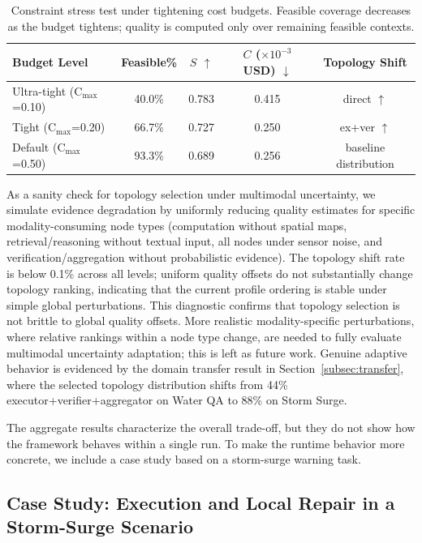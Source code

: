 \documentclass[manuscript,review,anonymous]{acmart}
\begin{document}
\begin{table}[t]
\centering
\caption{Constraint stress test under tightening cost budgets. Feasible coverage decreases as the budget tightens; quality is computed only over remaining feasible contexts.}
\label{tab:constraint_stress}
\small
\begin{tabular}{lcccc}
\toprule
\textbf{Budget Level} & \textbf{Feasible\%} & \textbf{$S$ $\uparrow$} & \textbf{$C$ ($\times 10^{-3}$ USD) $\downarrow$} & \textbf{Topology Shift} \\
\midrule
Ultra-tight (C$_{\max}$=0.10) & 40.0\% & 0.783 & 0.415 & direct $\uparrow$ \\
Tight (C$_{\max}$=0.20) & 66.7\% & 0.727 & 0.250 & ex+ver $\uparrow$ \\
Default (C$_{\max}$=0.50) & 93.3\% & 0.689 & 0.256 & baseline distribution \\
\bottomrule
\end{tabular}
\end{table}

As a sanity check for topology selection under multimodal uncertainty, we simulate evidence degradation by uniformly reducing quality estimates for specific modality-consuming node types (computation without spatial maps, retrieval/reasoning without textual input, all nodes under sensor noise, and verification/aggregation without probabilistic evidence). The topology shift rate is below 0.1\% across all levels; uniform quality offsets do not substantially change topology ranking, indicating that the current profile ordering is stable under simple global perturbations. This diagnostic confirms that topology selection is not brittle to global quality offsets. More realistic modality-specific perturbations, where relative rankings within a node type change, are needed to fully evaluate multimodal uncertainty adaptation; this is left as future work. Genuine adaptive behavior is evidenced by the domain transfer result in Section~\ref{subsec:transfer}, where the selected topology distribution shifts from 44\% executor+verifier+aggregator on Water QA to 88\% on Storm Surge.

The aggregate results characterize the overall trade-off, but they do not show how the framework behaves within a single run. To make the runtime behavior more concrete, we include a case study based on a storm-surge warning task.

\subsection{Case Study: Execution and Local Repair in a Storm-Surge Scenario}
\end{document}
